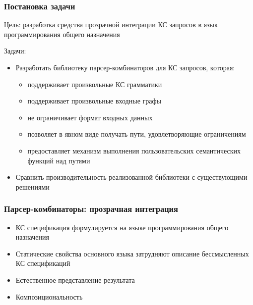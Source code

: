 \documentclass[xcolor=table]{beamer}
\begin{document}
\begin{frame}
  \transwipe[direction=90]
  \frametitle{Постановка задачи}

  Цель: разработка средства прозрачной интеграции КС запросов в язык программирования общего назначения

  Задачи:

  \begin{itemize}
      \item Разработать библиотеку парсер-комбинаторов для КС запросов, которая:
      \begin{itemize}
         \item поддерживает произвольные КС грамматики
         \item поддерживает произвольные входные графы
         \item не ограничивает формат входных данных
         \item позволяет в явном виде получать пути, удовлетворяющие ограничениям
         \item предоставляет механизм выполнения пользовательских семантических функций над путями
      \end{itemize}
      \item Сравнить производительность реализованной библиотеки с существующими решениями
  \end{itemize}

\end{frame}

\begin{frame}[fragile]
  \transwipe[direction=90]
  \frametitle{Парсер-комбинаторы: прозрачная интеграция}
\begin{itemize}
  \item КС спецификация формулируется на языке программирования общего назначения
  \item Статические свойства основного языка затрудняют описание бессмысленных КС спецификаций
  \item Естественное представление результата
  \item Композициональность
\end{itemize}
\end{frame}
\end{document}
